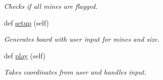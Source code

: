 \begin{DoxyCompactItemize}
\begin{DoxyCompactList}\small\item\em Checks if all mines are flagged. \end{DoxyCompactList}\item 
def \mbox{\hyperlink{classexecutive_1_1_executive_a45fd19b240299b2f39e9c83d25c47d4a}{setup}} (self)
\begin{DoxyCompactList}\small\item\em Generates board with user input for mines and size. \end{DoxyCompactList}\item 
def \mbox{\hyperlink{classexecutive_1_1_executive_a127200710d2bdb34a902c703928ab93a}{play}} (self)
\begin{DoxyCompactList}\small\item\em Takes coordinates from user and handles input. \end{DoxyCompactList}\end{DoxyCompactItemize}
